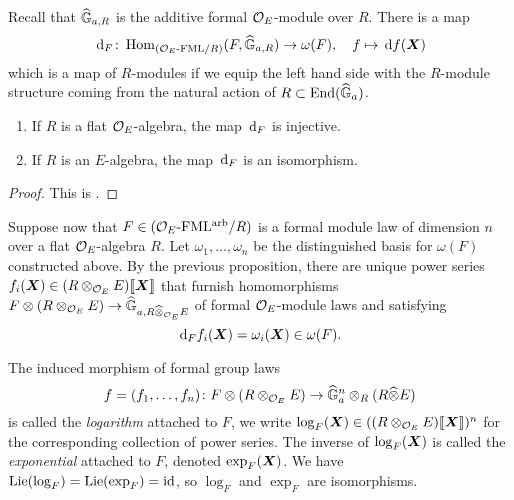 \documentclass[../main.tex]{subfiles}
\begin{document}
Recall that $\widehat{\mathbb{G}}_{a,R}$ is the additive formal ${\mathcal{O}_E}$-module over $R$. There is a map
\begin{equation} \label{eq:functorinvdifftohom}
  \, \mathrm{d}_{F} \colon  \operatorname{Hom}_{{({\mathcal{O}_E}\textnormal-\allowbreak\mathrm{FML}/{R})}} ({F}, \widehat{\mathbb{G}}_{a,R}) \to \omega({F}), \quad f \mapsto \, \mathrm{d} f(\boldsymbol{X})
\end{equation}
which is a map of $R$-modules if we equip the left hand side with the $R$-module
structure coming from the natural action of $R \subset \operatorname{End}(\widehat{\mathbb{G}}_a)$. 
\begin{prop}\label{prop:loginvdiff}
  \begin{enumerate}
    \item If $R$ is a flat ${\mathcal{O}_E}$-algebra, the map $\, \mathrm{d}_F$ is injective.
    \item If $R$ is an $E$-algebra, the map $\, \mathrm{d}_F$ is an isomorphism.
  \end{enumerate}
\begin{proof}
  This is \cite[Proposition 3.2]{hopkins1994equivariant}.
\end{proof}
\end{prop}

Suppose now that $F \in {({\mathcal{O}_E}\textnormal-\allowbreak\mathrm{FML^{arb}}/{R})}$ is a formal module law of dimension $n$
over a flat ${\mathcal{O}_E}$-algebra $R$. 
Let $\omega_1, \dots, \omega_n$ be the distinguished basis for $\omega(F)$
constructed above. 
By the previous proposition, there are unique power series 
$f_i(\boldsymbol{X}) \in (R \otimes_{\mathcal{O}_E} E)\llbracket \boldsymbol{X} \rrbracket$ that furnish homomorphisms
$F \otimes (R \otimes_{\mathcal{O}_E} E) \to \widehat{\mathbb{G}}_{a,R\widehat \otimes_{\mathcal{O}_E}E}$ of formal
${\mathcal{O}_E}$-module laws
and satisfying
\begin{equation*}
  \, \mathrm{d}_F f_i(\boldsymbol{X}) = \omega_i(\boldsymbol{X}) \in \omega(F).
\end{equation*}
\begin{defi}
  The induced morphism of formal group laws
  \begin{equation*}
    f = (f_1, \dots, f_n) \colon  F \otimes (R \otimes_{\mathcal{O}_E} E) \to \widehat{\mathbb{G}}_a^n \otimes_R (R \widehat \otimes E)
  \end{equation*}
  is called the \emph{logarithm} attached to $F$, we write 
  $\log_F(\boldsymbol{X}) \in ((R \otimes_{\mathcal{O}_E} E)\llbracket \boldsymbol{X} \rrbracket)^n$ for the corresponding collection
  of power series. The inverse of $\log_F(\boldsymbol{X})$ is called the \emph{exponential}
  attached to $F$, denoted $\exp_F(\boldsymbol{X})$. We have $\operatorname{Lie}(\log_F) = \operatorname{Lie}(\exp_F) = \operatorname{id}$,
  so $\log_F$ and $\exp_F$ are isomorphisms.
\end{defi}
\end{document}
